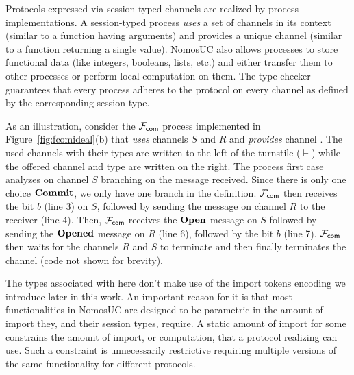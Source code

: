 

Protocols expressed via session typed channels are realized by process implementations.
A session-typed process \emph{uses} a set of channels in its context (similar to a function
having arguments) and provides a unique channel (similar to a function returning a single value).
NomosUC also allows processes to store functional data (like integers, booleans, lists, etc.)
and either transfer them to other processes or perform local computation on them.
The type checker guarantees that every process adheres to the protocol on every channel as defined by
the corresponding session type.


As an illustration, consider the $\mathcal{F}_{{\mathsf {com}}}$ process implemented in Figure~\ref{fig:fcomideal}(b)
that \emph{uses} channels $S$ and $R$ and \emph{provides} channel .
The used channels with their types are written to the left of the turnstile
($\vdash$) while the offered channel and type are written on the right.
The process first case analyzes on channel $S$ branching on the
message received.
Since there is only one choice $\mathbf{Commit}$, we only have one
branch in the definition.
$\mathcal{F}_{{\mathsf {com}}}$ then receives the bit $b$ (line 3) on $S$, followed by sending the
 message on channel $R$ to the receiver (line 4).
Then, $\mathcal{F}_{{\mathsf {com}}}$ receives the $\mathbf{Open}$ message on $S$ followed by sending the
$\mathbf{Opened}$ message on $R$ (line 6), followed by the bit $b$ (line 7).
$\mathcal{F}_{{\mathsf {com}}}$ then waits for the channels $R$ and $S$ to terminate and then finally
terminates the  channel (code not shown for brevity).

The types associated with \Fcom here don't make use of the import tokens encoding we 
introduce later in this work. An important reason for it is that most functionalities
in NomosUC are designed to be parametric in the amount of import they, and their
session types, require. A static amount of import for some \F constrains the 
amount of import, or computation, that a protocol realizing \F can use. 
Such a constraint is unnecessarily restrictive requiring multiple versions
of the same functionality for different protocols. 


